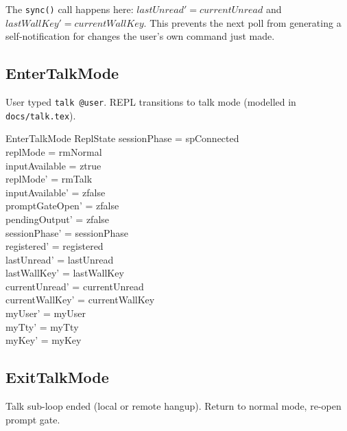 \documentclass[a4paper,10pt,fleqn]{article}
\begin{document}
The \texttt{sync()} call happens here: $lastUnread' = currentUnread$
and $lastWallKey' = currentWallKey$.  This prevents the next poll
from generating a self-notification for changes the user's own
command just made.

\subsection{EnterTalkMode}

User typed \texttt{talk @user}.  REPL transitions to talk mode
(modelled in \texttt{docs/talk.tex}).

\begin{schema}{EnterTalkMode}
  \Delta ReplState
\where
  sessionPhase = spConnected \\
  replMode = rmNormal \\
  inputAvailable = ztrue \\
  replMode' = rmTalk \\
  inputAvailable' = zfalse \\
  promptGateOpen' = zfalse \\
  pendingOutput' = zfalse \\
  sessionPhase' = sessionPhase \\
  registered' = registered \\
  lastUnread' = lastUnread \\
  lastWallKey' = lastWallKey \\
  currentUnread' = currentUnread \\
  currentWallKey' = currentWallKey \\
  myUser' = myUser \\
  myTty' = myTty \\
  myKey' = myKey
\end{schema}

\subsection{ExitTalkMode}

Talk sub-loop ended (local or remote hangup).  Return to normal
mode, re-open prompt gate.
\end{document}
